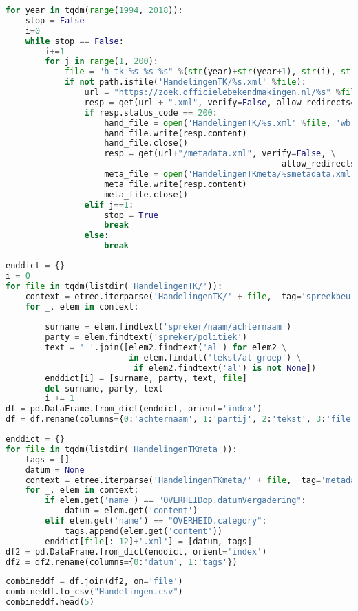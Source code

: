 \begin{lstlisting}[language=Python]
for year in tqdm(range(1994, 2018)):
    stop = False
    i=0
    while stop == False:
        i+=1
        for j in range(1, 200):
            file = "h-tk-%s-%s-%s" %(str(year)+str(year+1), str(i), str(j))
            if not path.isfile('HandelingenTK/%s.xml' %file):
                url = "https://zoek.officielebekendmakingen.nl/%s" %file
                resp = get(url + ".xml", verify=False, allow_redirects=False)
                if resp.status_code == 200:
                    hand_file = open('HandelingenTK/%s.xml' %file, 'wb')
                    hand_file.write(resp.content)
                    hand_file.close()
                    resp = get(url+"/metadata.xml", verify=False, \
                                                        allow_redirects=False)
                    meta_file = open('HandelingenTKmeta/%smetadata.xml' %file, 'wb')
                    meta_file.write(resp.content)
                    meta_file.close()    
                elif j==1:
                    stop = True
                    break
                else:
                    break
\end{lstlisting}

\begin{lstlisting}[language=Python]
enddict = {}
i = 0
for file in tqdm(listdir('HandelingenTK/')):
    context = etree.iterparse('HandelingenTK/' + file,  tag='spreekbeurt')
    for _, elem in context:
        
        surname = elem.findtext('spreker/naam/achternaam')
        party = elem.findtext('spreker/politiek')
        text = ' '.join([elem2.findtext('al') for elem2 \
                         in elem.findall('tekst/al-groep') \
                          if elem2.findtext('al') is not None])
        enddict[i] = [surname, party, text, file]
        del surname, party, text
        i += 1
df = pd.DataFrame.from_dict(enddict, orient='index')
df = df.rename(columns={0:'achternaam', 1:'partij', 2:'tekst', 3:'file'})
\end{lstlisting}

\begin{lstlisting}[language=Python]
enddict = {}
for file in tqdm(listdir('HandelingenTKmeta')):
    tags = []
    datum = None
    context = etree.iterparse('HandelingenTKmeta/' + file,  tag='metadata')
    for _, elem in context:
        if elem.get('name') == "OVERHEIDop.datumVergadering":
            datum = elem.get('content')
        elif elem.get('name') == "OVERHEID.category":
            tags.append(elem.get('content'))
        enddict[file[:-12]+'.xml'] = [datum, tags]
df2 = pd.DataFrame.from_dict(enddict, orient='index')
df2 = df2.rename(columns={0:'datum', 1:'tags'})
\end{lstlisting}

\begin{lstlisting}[language=Python]
combineddf = df.join(df2, on='file')
combineddf.to_csv("Handelingen.csv")
combineddf.head(5)
\end{lstlisting}

